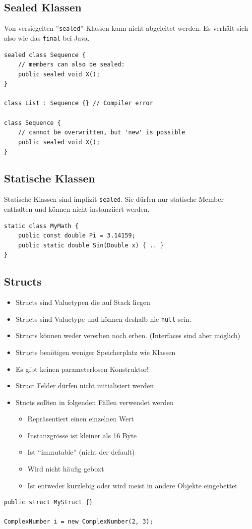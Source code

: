 \documentclass[
a4paper,
oneside,
10pt,
fleqn,
headsepline,
toc=listofnumbered, 
bibliography=totocnumbered]{scrartcl}
\begin{document}
\subsection{Sealed Klassen}

Von versiegelten ''\lstinline|sealed|'' Klassen kann nicht abgeleitet werden. Es verhält sich also wie das \lstinline|final| bei Java.
\begin{lstlisting}
sealed class Sequence {
	// members can also be sealed:
	public sealed void X();
}

class List : Sequence {} // Compiler error

class Sequence {
	// cannot be overwritten, but 'new' is possible
	public sealed void X();
}

\end{lstlisting}

\subsection{Statische Klassen}
Statische Klassen sind implizit \lstinline|sealed|. Sie dürfen nur statische Member enthalten und können nicht instanziiert werden.
\begin{lstlisting}
static class MyMath {
	public const double Pi = 3.14159;
	public static double Sin(Double x) { .. }
}
\end{lstlisting}
\clearpage

\subsection{Structs}
\begin{itemize}
	\item Structs sind Valuetypen die auf Stack liegen
	\item Structs sind Valuetype und können deshalb nie \lstinline[]|null| sein.
	\item Structs können weder vererben noch erben. (Interfaces sind aber möglich)
	\item Structs benötigen weniger Speicherplatz wie Klassen
	\item Es gibt keinen parameterlosen Konstruktor!
	\item Struct Felder dürfen nicht initialisiert werden
	\item Stucts sollten in folgenden Fällen verwendet werden
	\begin{itemize}
		\item Repräsentiert einen einzelnen Wert
		\item Instanzgrösse ist kleiner als 16 Byte
		\item Ist “immutable” (nicht der default)
		\item Wird nicht häufig geboxt
		\item Ist entweder kurzlebig oder wird meist in andere Objekte eingebettet
	\end{itemize}
\end{itemize}
\begin{lstlisting}
public struct MyStruct {}

ComplexNumber i = new ComplexNumber(2, 3);
\end{lstlisting}
\end{document}
